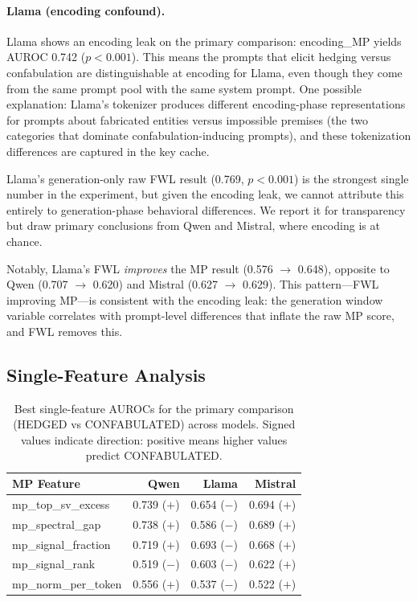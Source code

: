 \paragraph{Llama (encoding confound).}
Llama shows an encoding leak on the primary comparison: encoding\_MP
yields AUROC 0.742 ($p < 0.001$). This means the prompts that elicit
hedging versus confabulation are distinguishable at encoding for Llama,
even though they come from the same prompt pool with the same system
prompt. One possible explanation: Llama's tokenizer produces different
encoding-phase representations for prompts about fabricated entities versus
impossible premises (the two categories that dominate confabulation-inducing
prompts), and these tokenization differences are captured in the key cache.

Llama's generation-only raw FWL result (0.769, $p < 0.001$) is the
strongest single number in the experiment, but given the encoding leak,
we cannot attribute this entirely to generation-phase behavioral differences.
We report it for transparency but draw primary conclusions from Qwen and
Mistral, where encoding is at chance.

Notably, Llama's FWL \emph{improves} the MP result (0.576 $\to$ 0.648),
opposite to Qwen (0.707 $\to$ 0.620) and Mistral (0.627 $\to$ 0.629).
This pattern---FWL improving MP---is consistent with the encoding leak:
the generation window variable correlates with prompt-level differences
that inflate the raw MP score, and FWL removes this.

\subsection{Single-Feature Analysis}

\begin{table}[H]
\centering
\caption{Best single-feature AUROCs for the primary comparison
  (HEDGED vs CONFABULATED) across models. Signed values indicate
  direction: positive means higher values predict CONFABULATED.}
\label{tab:single_features}
\begin{tabular}{lrrr}
\toprule
MP Feature & Qwen & Llama & Mistral \\
\midrule
mp\_top\_sv\_excess    & 0.739 ($+$) & 0.654 ($-$) & 0.694 ($+$) \\
mp\_spectral\_gap      & 0.738 ($+$) & 0.586 ($-$) & 0.689 ($+$) \\
mp\_signal\_fraction   & 0.719 ($+$) & 0.693 ($-$) & 0.668 ($+$) \\
mp\_signal\_rank       & 0.519 ($-$) & 0.603 ($-$) & 0.622 ($+$) \\
mp\_norm\_per\_token   & 0.556 ($+$) & 0.537 ($-$) & 0.522 ($+$) \\
\bottomrule
\end{tabular}
\end{table}

